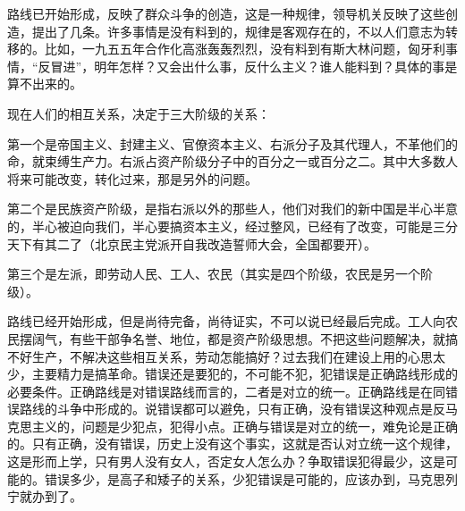 路线已开始形成，反映了群众斗争的创造，这是一种规律，领导机关反映了这些创造，提出了几条。许多事情是没有料到的，规律是客观存在的，不以人们意志为转移的。比如，一九五五年合作化高涨轰轰烈烈，没有料到有斯大林问题，匈牙利事情，“反冒进”，明年怎样？又会出什么事，反什么主义？谁人能料到？具体的事是算不出来的。

现在人们的相互关系，决定于三大阶级的关系：

第一个是帝国主义、封建主义、官僚资本主义、右派分子及其代理人，不革他们的命，就束缚生产力。右派占资产阶级分子中的百分之一或百分之二。其中大多数人将来可能改变，转化过来，那是另外的问题。

第二个是民族资产阶级，是指右派以外的那些人，他们对我们的新中国是半心半意的，半心被迫向我们，半心要搞资本主义，经过整风，已经有了改变，可能是三分天下有其二了（北京民主党派开自我改造誓师大会，全国都要开）。

第三个是左派，即劳动人民、工人、农民（其实是四个阶级，农民是另一个阶级）。

路线已经开始形成，但是尚待完备，尚待证实，不可以说已经最后完成。工人向农民摆阔气，有些干部争名誉、地位，都是资产阶级思想。不把这些问题解决，就搞不好生产，不解决这些相互关系，劳动怎能搞好？过去我们在建设上用的心思太少，主要精力是搞革命。错误还是要犯的，不可能不犯，犯错误是正确路线形成的必要条件。正确路线是对错误路线而言的，二者是对立的统一。正确路线是在同错误路线的斗争中形成的。说错误都可以避免，只有正确，没有错误这种观点是反马克思主义的，问题是少犯点，犯得小点。正确与错误是对立的统一，难免论是正确的。只有正确，没有错误，历史上没有这个事实，这就是否认对立统一这个规律，这是形而上学，只有男人没有女人，否定女人怎么办？争取错误犯得最少，这是可能的。错误多少，是高子和矮子的关系，少犯错误是可能的，应该办到，马克思列宁就办到了。


